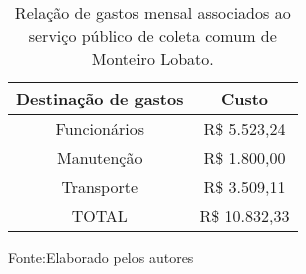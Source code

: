 \begin{table}[htbp]
\caption{Relação de gastos mensal associados ao serviço público de coleta comum de Monteiro Lobato.}
\begin{center}
\begin{tabular}{|c|c|}
\hline
\textbf{Destinação de gastos} & \textbf{Custo} \\ \hline
Funcionários & R\$ 5.523,24 \\ \hline
Manutenção & R\$ 1.800,00 \\ \hline
Transporte & R\$ 3.509,11 \\ \hline
TOTAL & R\$ 10.832,33 \\ \hline
\end{tabular}
Fonte:Elaborado pelos autores
\end{center}
\label{tab:gasto_mensal}
\end{table}

